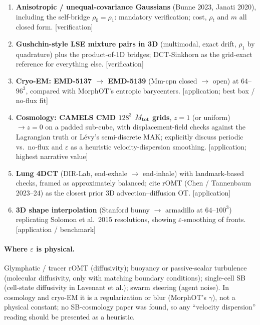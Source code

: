 \documentclass[11pt]{article}
\newcommand{\eps}{\varepsilon}
\begin{document}
\begin{enumerate}[leftmargin=1.8em, itemsep=3pt]
  \item \textbf{Anisotropic / unequal-covariance Gaussians} (Bunne 2023, Janati
        2020), including the self-bridge $\rho_0=\rho_1$: mandatory verification;
        cost, $\rho_t$ and $m$ all closed form. [verification]
  \item \textbf{Gushchin-style LSE mixture pairs in 3D} (multimodal, exact drift,
        $\rho_1$ by quadrature) plus the product-of-1D bridges; DCT-Sinkhorn as the
        grid-exact reference for everything else. [verification]
  \item \textbf{Cryo-EM: EMD-5137 $\to$ EMD-5139} (Mm-cpn closed $\to$ open) at
        $64$--$96^3$, compared with MorphOT's entropic barycenters. [application;
        best box / no-flux fit]
  \item \textbf{Cosmology: CAMELS CMD $128^3$ $M_{\rm tot}$ grids}, $z=1$ (or
        uniform) $\to z=0$ on a padded sub-cube, with displacement-field checks
        against the Lagrangian truth or L\'evy's semi-discrete MAK; explicitly
        discuss periodic vs.\ no-flux and $\eps$ as a heuristic velocity-dispersion
        smoothing. [application; highest narrative value]
  \item \textbf{Lung 4DCT} (DIR-Lab, end-exhale $\to$ end-inhale) with
        landmark-based checks, framed as approximately balanced; cite rOMT
        (Chen / Tannenbaum 2023--24) as the closest prior 3D advection--diffusion OT.
        [application]
  \item \textbf{3D shape interpolation} (Stanford bunny $\to$ armadillo at
        $64$--$100^3$) replicating Solomon et al.\ 2015 resolutions, showing
        $\eps$-smoothing of fronts. [application / benchmark]
\end{enumerate}

\paragraph{Where $\eps$ is physical.} Glymphatic / tracer rOMT (diffusivity);
buoyancy or passive-scalar turbulence (molecular diffusivity, only with matching
boundary conditions); single-cell SB (cell-state diffusivity in Lavenant et al.);
swarm steering (agent noise). In cosmology and cryo-EM it is a regularization or blur
(MorphOT's $\gamma$), not a physical constant; no SB-cosmology paper was found, so any
``velocity dispersion'' reading should be presented as a heuristic.
\end{document}
